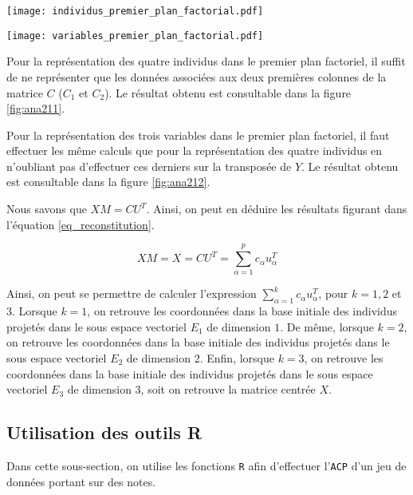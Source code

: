 \documentclass{article}
\begin{document}
\begin{multicols}{2}
\begingroup
    \centering
   \texttt{[image: individus\_premier\_plan\_factorial.pdf]}
    \label{fig:ana211}
\endgroup

\begingroup
    \centering
   \texttt{[image: variables\_premier\_plan\_factorial.pdf]}
    \label{fig:ana212}
\endgroup


Pour la représentation des quatre individus dans le premier plan factoriel, il suffit de ne représenter que les données associées aux deux premières colonnes de la matrice $C$ ($C_1$ et $C_2$). Le résultat obtenu est consultable dans la figure \ref{fig:ana211}.

Pour la représentation des trois variables dans le premier plan factoriel, il faut effectuer les même calculs que pour la représentation des quatre individus en n'oubliant pas d'effectuer ces derniers sur la transposée de $Y$. Le résultat obtenu est consultable dans la figure \ref{fig:ana212}.

Nous savons que $X M = C U^T$. Ainsi, on peut en déduire les résultats figurant dans l'équation \ref{eq_reconstitution}.

\begin{equation}
	\label{eq_reconstitution}
    X M = X = C U^T = \sum_{\alpha = 1}^{p} c_{\alpha} u_{\alpha}^T 
\end{equation}

Ainsi, on peut se permettre de calculer l'expression $\sum_{\alpha = 1}^{k} c_{\alpha} u_{\alpha}^T $, pour $k = 1, 2$ et $3$. Lorsque $k=1$, on retrouve les coordonnées dans la base initiale des individus projetés dans le sous espace vectoriel $E_1$ de dimension $1$. De même, lorsque $k=2$, on retrouve les coordonnées dans la base initiale des individus projetés dans le sous espace vectoriel $E_2$ de dimension $2$. Enfin, lorsque $k=3$, on retrouve les coordonnées dans la base initiale des individus projetés dans le sous espace vectoriel $E_3$ de dimension $3$, soit on retrouve la matrice centrée $X$.  

\subsection{Utilisation des outils R}
Dans cette sous-section, on utilise les fonctions \texttt{R} afin d'effectuer l'\texttt{ACP} d'un jeu de données portant sur des notes.


\end{multicols}
\end{document}
